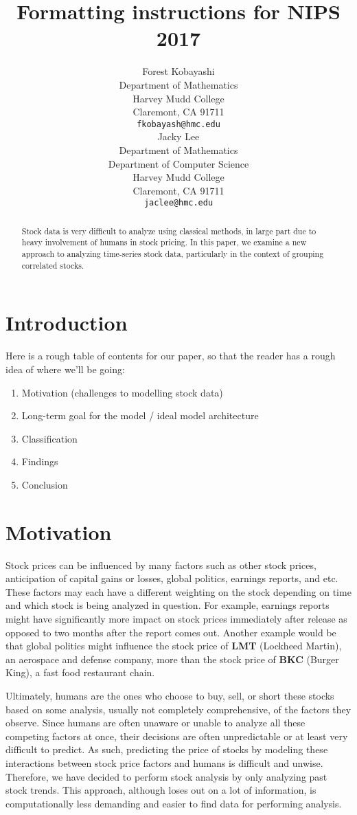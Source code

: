 \documentclass[final]{article}
\title{Formatting instructions for NIPS 2017}
\author{
  Forest Kobayashi \\
  Department of Mathematics\\
  Harvey Mudd College\\
  Claremont, CA 91711 \\
  \texttt{fkobayash@hmc.edu} \\
  \And
  Jacky Lee \\
  Department of Mathematics\\
  Department of Computer Science \\
  Harvey Mudd College \\
  Claremont, CA 91711 \\
  \texttt{jaclee@hmc.edu}
}
\begin{document}

\maketitle

\begin{abstract}
  Stock data is very difficult to analyze using classical methods, in
  large part due to heavy involvement of humans in stock pricing. In
  this paper, we examine a new approach to analyzing time-series stock
  data, particularly in the context of grouping correlated stocks.
\end{abstract}

\section{Introduction}
Here is a rough table of contents for our paper, so that the reader
has a rough idea of where we'll be going:
\begin{enumerate}
\item Motivation (challenges to modelling stock data)
\item Long-term goal for the model / ideal model architecture
\item Classification
\item Findings
\item Conclusion
\end{enumerate}

\section{Motivation}
Stock prices can be influenced by many factors such as other stock prices,
anticipation of capital gains or losses, global politics, earnings reports, and
etc. These factors may each have a different weighting on the stock depending
on time and which stock is being analyzed in question. For example, earnings
reports might have significantly more impact on stock prices immediately after
release as opposed to two months after the report comes out. Another example
would be that global politics might influence the stock price of \textbf{LMT}
(Lockheed Martin), an aerospace and defense company, more than the stock price
of \textbf{BKC} (Burger King), a fast food restaurant chain.

Ultimately, humans are the ones who choose to buy, sell, or short these stocks
based on some analysis, usually not completely comprehensive, of the factors
they observe. Since humans are often unaware or unable to analyze all these
competing factors at once, their decisions are often unpredictable or at least
very difficult to predict. As such, predicting the price of stocks by modeling
these interactions between stock price factors and humans is difficult and
unwise. Therefore, we have decided to perform stock analysis by only analyzing
past stock trends. This approach, although loses out on a lot of information,
is computationally less demanding and easier to find data for performing
analysis.
\end{document}
